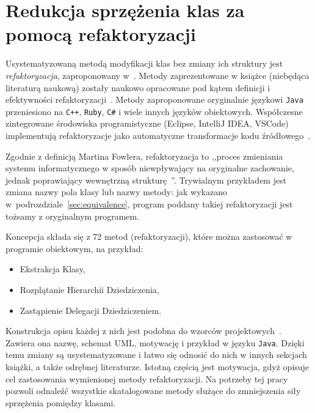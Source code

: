\section{Redukcja sprzężenia klas za pomocą refaktoryzacji}
\label{sub:refactoring}

Usystematyzowaną metodą modyfikacji klas bez zmiany ich struktury jest \textit{refaktoryzacja},
zaproponowany w~\cite{fowler2018refactoring}.
Metody zaprezentowane w książce (niebędąca literaturą naukową) zostały naukowo opracowane pod kątem definicji i
efektywności refaktoryzacji~\cite{opdyke1992refactoring, stroggylos2007refactoring}.
Metody zaproponowane oryginalnie językowi \texttt{Java} przeniesiono na \texttt{C++}, \texttt{Ruby}, \texttt{C\#} i
wiele innych języków obiektowych.
Współczesne zintegrowane środowiska programistyczne (Eclipse, IntelliJ IDEA, VSCode) implementują refaktoryzacje
jako automatyczne transformacje kodu źródłowego~\cite{drozdz2006refactoring}.

Zgodnie z definicją Martina Fowlera, refaktoryzacja to ,,proces zmieniania systemu informatycznego w sposób
niewpływający na oryginalne zachowanie, jednak poprawiający wewnętrzną strukturę~\cite{fowler2018refactoring}''.
Trywialnym przykładem jest zmiana nazwy pola klasy lub nazwy metody: jak wykazano
w~podrozdziale~\ref{sec:equivalence}, program poddany takiej refaktoryzacji jest tożsamy z oryginalnym programem.

Koncepcja składa się z 72 metod (refaktoryzacji), które można zastosować w programie obiektowym, na przykład:
\begin{itemize}
    \item Ekstrakcja Klasy,
    \item Rozplątanie Hierarchii Dziedziczenia,
    \item Zastąpienie Delegacji Dziedziczeniem.
\end{itemize}

Konstrukcja opisu każdej z nich jest podobna do wzorców projektowych~\cite{gamma1994design}.
Zawiera ona nazwę, schemat UML, motywację i przykład w języku \texttt{Java}.
Dzięki temu zmiany są usystematyzowane i łatwo się odnosić do nich w innych sekcjach książki, a także odrębnej
literaturze.
Istotną częścią jest motywacja, gdyż opisuje cel zastosowania wymienionej metody refaktoryzacji.
Na potrzeby tej pracy pozwoli odnaleźć wszystkie skatalogowane metody służące do zmniejszenia siły sprzężenia pomiędzy
klasami.

